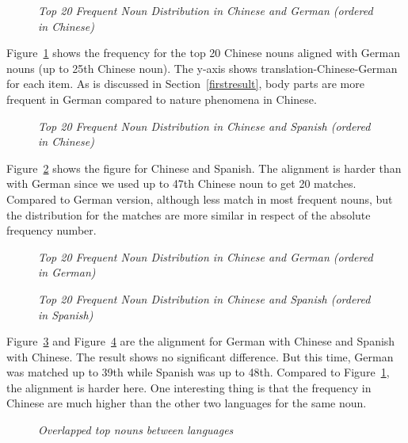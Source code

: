 \begin{figure}[t]
\centerline{}
\caption{{\it Top 20 Frequent Noun Distribution in Chinese and German (ordered in Chinese)}}
\label{fig1}
\end{figure}

Figure~\ref{fig1} shows the frequency for the top 20 Chinese nouns aligned with German nouns (up to 25th Chinese noun). The y-axis shows translation-Chinese-German for each item. As is discussed in Section~\ref{firstresult}, body parts are more frequent in German compared to nature phenomena in Chinese. 

\begin{figure}[t]
\centerline{}
\caption{{\it Top 20 Frequent Noun Distribution in Chinese and Spanish (ordered in Chinese)}}
\label{fig2}
\end{figure}

Figure~\ref{fig2} shows the figure for Chinese and Spanish. The alignment is harder than with German since we used up to 47th Chinese noun to get 20 matches. Compared to German version, although less match in most frequent nouns, but the distribution for the matches are more similar in respect of the absolute frequency number. 

\begin{figure}[t]
\centerline{}
\caption{{\it Top 20 Frequent Noun Distribution in Chinese and German (ordered in German)}}
\label{fig3}
\end{figure}

\begin{figure}[t]
\centerline{}
\caption{{\it Top 20 Frequent Noun Distribution in Chinese and Spanish (ordered in Spanish)}}
\label{fig4}
\end{figure}

Figure~\ref{fig3} and Figure~\ref{fig4} are the alignment for German with Chinese and Spanish with Chinese. The result shows no significant difference. But this time, German was matched up to 39th while Spanish was up to 48th. Compared to Figure~\ref{fig1}, the alignment is harder here. One interesting thing is that the frequency in Chinese are much higher than the other two languages for the same noun. 

\begin{figure}[t]
\centerline{}
\caption{{\it Overlapped top nouns between languages}}
\label{fig5}
\end{figure}

